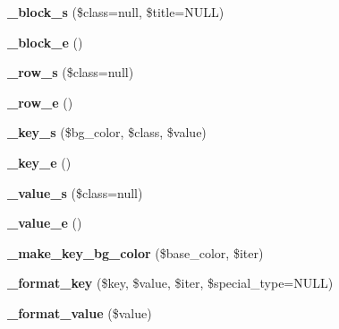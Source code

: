 \begin{DoxyCompactItemize}
\item 
\mbox{\label{class_dbug_l_a7e72eb9c84f4f0c2fe153642ddb4c4f9}} 
{\bfseries \+\_\+block\+\_\+s} (\$class=\textquotesingle{}null\textquotesingle{}, \$title=N\+U\+LL)
\item 
\mbox{\label{class_dbug_l_af6a70d7736e478b5c3b01f82adac0ac9}} 
{\bfseries \+\_\+block\+\_\+e} ()
\item 
\mbox{\label{class_dbug_l_a06667e93215f834f8caf4db67678551e}} 
{\bfseries \+\_\+row\+\_\+s} (\$class=\textquotesingle{}null\textquotesingle{})
\item 
\mbox{\label{class_dbug_l_a51663c177f44acbec564fd8698bd372f}} 
{\bfseries \+\_\+row\+\_\+e} ()
\item 
\mbox{\label{class_dbug_l_aeb1c15638f05146cf5d46abbff827e75}} 
{\bfseries \+\_\+key\+\_\+s} (\$bg\+\_\+color, \$class, \$value)
\item 
\mbox{\label{class_dbug_l_ae1339a1e78cf0fc0953f0ed88addcf35}} 
{\bfseries \+\_\+key\+\_\+e} ()
\item 
\mbox{\label{class_dbug_l_abf8a67721334e3a2fd32d5263e58b5af}} 
{\bfseries \+\_\+value\+\_\+s} (\$class=\textquotesingle{}null\textquotesingle{})
\item 
\mbox{\label{class_dbug_l_a975dbf588381f78cef42c7262a0bf6c2}} 
{\bfseries \+\_\+value\+\_\+e} ()
\item 
\mbox{\label{class_dbug_l_a97f268ad4d27f45c8c3ec48c2f444abf}} 
{\bfseries \+\_\+make\+\_\+key\+\_\+bg\+\_\+color} (\$base\+\_\+color, \$iter)
\item 
\mbox{\label{class_dbug_l_a06297e9e2b6689ac28defc11a5adee7d}} 
{\bfseries \+\_\+format\+\_\+key} (\$key, \$value, \$iter, \$special\+\_\+type=N\+U\+LL)
\item 
\mbox{\label{class_dbug_l_a749b00eebbe81490001a3e0c3e551225}} 
{\bfseries \+\_\+format\+\_\+value} (\$value)
\end{DoxyCompactItemize}
